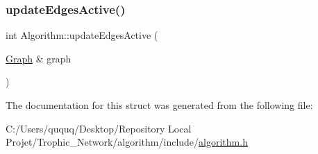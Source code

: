 \subsubsection{\texorpdfstring{update\+Edges\+Active()}{updateEdgesActive()}}
{\footnotesize\ttfamily int Algorithm\+::update\+Edges\+Active (\begin{DoxyParamCaption}\item[{\mbox{\hyperlink{class_graph}{Graph}} \&}]{graph }\end{DoxyParamCaption})}



The documentation for this struct was generated from the following file\+:\begin{DoxyCompactItemize}
\item 
C\+:/\+Users/ququq/\+Desktop/\+Repository Local Projet/\+Trophic\+\_\+\+Network/algorithm/include/\mbox{\hyperlink{algorithm_8h}{algorithm.\+h}}\end{DoxyCompactItemize}
